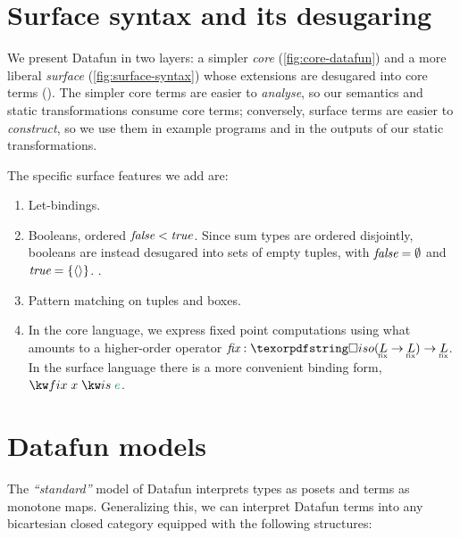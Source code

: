 \section{Surface syntax and its desugaring}
\label{sec:syntax}

We present Datafun in two layers: a simpler \emph{core}
(\cref{fig:core-datafun}) and a more liberal \emph{surface}
(\cref{fig:surface-syntax}) whose extensions are desugared into core terms
().
%
The simpler core terms are easier to \emph{analyse}, so our semantics and static
transformations consume core terms; conversely, surface terms are easier to
\emph{construct}, so we use them in example programs and in the outputs of our
static transformations.

The specific surface features we add are:
\begin{enumerate}
\item Let-bindings.

\item Booleans, ordered $\text{\itshape false} < \text{\itshape true}$. Since sum types are ordered
  disjointly, booleans are instead desugared into sets of empty tuples, with
  $\text{\itshape false} = \emptyset$ and $\text{\itshape true} = \{{\langle{}\rangle}\}$. .

\item Pattern matching on tuples and boxes. 


\item In the core language, we express fixed point computations using what
  amounts to a higher-order operator $\prim{fix} : \iso{(\fixt L \to \fixt L)}
  \to \fixt L$. In the surface language there is a more convenient binding form,
  $\efixisd x e$.

\end{enumerate}


\section{Datafun models}
\label{sec:datafun-models}

The \emph{``standard''} model of Datafun interprets types as posets and terms as
monotone maps. Generalizing this, we can interpret Datafun terms into any
bicartesian closed category \catC{} equipped with the following structures:

